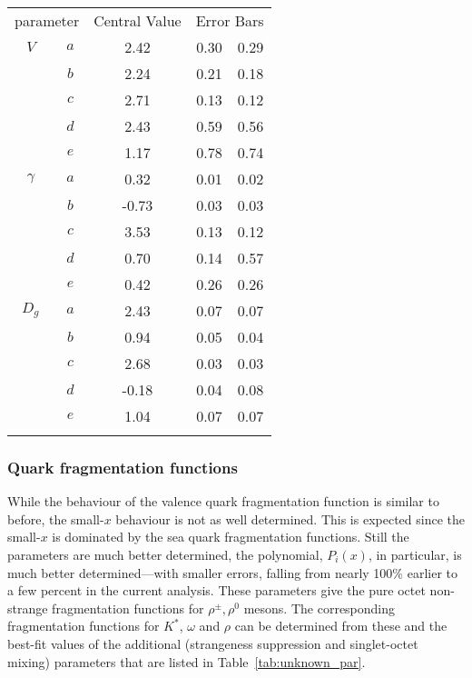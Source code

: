 \documentclass{ws-ijmpa}
\begin{document}
\begin{table}[tbh]
{\begin{tabular}{ccccc} \toprule
\multicolumn{2}{c}{parameter} & Central Value
& \multicolumn{2}{c}{Error Bars}   \\
\cline{4-5}
$V$     &$a$ & 2.42   & 0.30  &  0.29 \\
        &$b$ & 2.24   & 0.21  &  0.18 \\
        &$c$ & 2.71   & 0.13  &  0.12  \\
        &$d$ & 2.43   & 0.59  &  0.56 \\
        &$e$ & 1.17   & 0.78  &  0.74 \\ \hline
$\gamma$&$a$ & 0.32   & 0.01  &  0.02  \\
        &$b$ & -0.73  & 0.03  &  0.03  \\
        &$c$ & 3.53    & 0.13 &  0.12 \\
        &$d$ & 0.70   & 0.14  &  0.57 \\
        &$e$ & 0.42   & 0.26  &  0.26  \\ \hline
$D_g$   &$a$ & 2.43   & 0.07  &  0.07  \\
        &$b$ & 0.94   & 0.05  &  0.04 \\
        &$c$ & 2.68   & 0.03  &  0.03  \\
        &$d$ & -0.18  & 0.04  &  0.08  \\
        &$e$ & 1.04   & 0.07  &  0.07  \\ \botrule
\end{tabular}
\label{tab:inputs}}
\end{table}

\subsubsection{Quark fragmentation functions}
\label{Qffns}
While the behaviour of the valence quark fragmentation function is
similar to before, the small-$x$ behaviour is not as well determined.
This is expected since the small-$x$ is dominated by the sea quark
fragmentation functions. Still the parameters are much better
determined, the polynomial, $P_i(x)$, in particular,  is much better
determined---with smaller errors, falling from
nearly 100\% earlier to a few percent in the current analysis. These
parameters give the pure octet non-strange fragmentation functions for
$\rho^\pm, \rho^0$ mesons. The corresponding fragmentation functions for
$K^*$, $\omega$ and $\rho$ can be determined from these and the best-fit
values of the additional (strangeness suppression and singlet-octet
mixing) parameters that are listed in Table~\ref{tab:unknown_par}.
\end{document}

